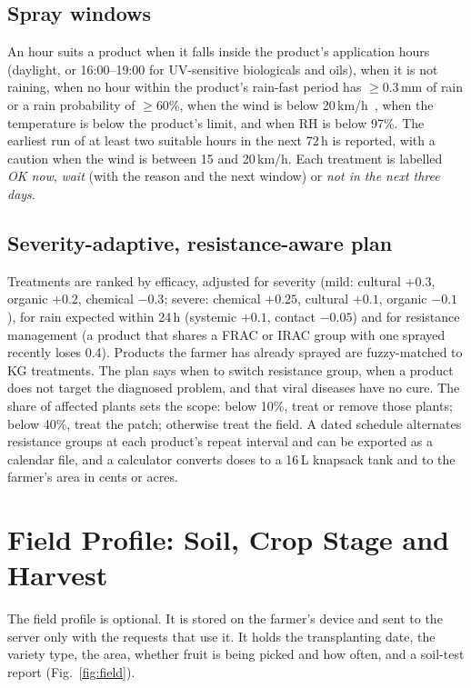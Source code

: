 \documentclass[conference]{IEEEtran}
\begin{document}
\subsection{Spray windows}
An hour suits a product when it falls inside the product's application hours (daylight, or 16:00--19:00 for UV-sensitive biologicals and oils), when it is not raining, when no hour within the product's rain-fast period has $\geq$0.3\,mm of rain or a rain probability of $\geq$60\%, when the wind is below 20\,km/h~\cite{agvic_wind}, when the temperature is below the product's limit, and when RH is below 97\%. The earliest run of at least two suitable hours in the next 72\,h is reported, with a caution when the wind is between 15 and 20\,km/h. Each treatment is labelled \emph{OK now}, \emph{wait} (with the reason and the next window) or \emph{not in the next three days}.

\subsection{Severity-adaptive, resistance-aware plan}
Treatments are ranked by efficacy, adjusted for severity (mild: cultural $+0.3$, organic $+0.2$, chemical $-0.3$; severe: chemical $+0.25$, cultural $+0.1$, organic $-0.1$), for rain expected within 24\,h (systemic $+0.1$, contact $-0.05$) and for resistance management (a product that shares a FRAC or IRAC group with one sprayed recently loses 0.4). Products the farmer has already sprayed are fuzzy-matched to KG treatments. The plan says when to switch resistance group, when a product does not target the diagnosed problem, and that viral diseases have no cure. The share of affected plants sets the scope: below 10\%, treat or remove those plants; below 40\%, treat the patch; otherwise treat the field. A dated schedule alternates resistance groups at each product's repeat interval and can be exported as a calendar file, and a calculator converts doses to a 16\,L knapsack tank and to the farmer's area in cents or acres.

\section{Field Profile: Soil, Crop Stage and Harvest}
\label{sec:field}

The field profile is optional. It is stored on the farmer's device and sent to the server only with the requests that use it. It holds the transplanting date, the variety type, the area, whether fruit is being picked and how often, and a soil-test report (Fig.~\ref{fig:field}).
\end{document}
